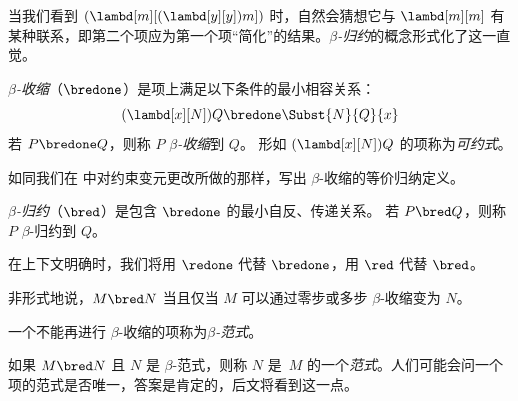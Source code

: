 \documentclass[../../../include/open-logic-section]{subfiles}
\begin{document}

当我们看到 $(\lambd[m][(\lambd[y][y]) m])$ 时，自然会猜想它与 $\lambd[m][m]$ 有某种联系，即第二个项应为第一个项“简化”的结果。\emph{$\beta$-归约}的概念形式化了这一直觉。

\begin{defn} 
  \emph{$\beta$-收缩}（$\bredone$）是项上满足以下条件的最小相容关系：
  \[
    (\lambd[x][N])Q \bredone \Subst{N}{Q}{x}
  \]
  若 $P \bredone Q$，则称 $P$ \emph{$\beta$-收缩}到 $Q$。
  形如 $(\lambd[x][N])Q$ 的项称为\emph{可约式}。
\end{defn}

\begin{prob} 
  如同我们在  中对约束变元更改所做的那样，写出 $\beta$-收缩的等价归纳定义。
\end{prob}

\begin{defn} 
  \emph{$\beta$-归约}（$\bred$）是包含 $\bredone$ 的最小自反、传递关系。
  若 $P \bred Q$，则称 $P$ $\beta$-归约到 $Q$。
\end{defn}

在上下文明确时，我们将用 $\redone$ 代替 $\bredone$，用 $\red$ 代替 $\bred$。

非形式地说，$M \bred N$ 当且仅当 $M$ 可以通过零步或多步 $\beta$-收缩变为 $N$。

\begin{defn}[$\beta$-范式]
一个不能再进行 $\beta$-收缩的项称为\emph{$\beta$-范式}。
\end{defn}

如果 $M \bred N$ 且 $N$ 是 $\beta$-范式，则称 $N$ 是~$M$ 的一个\emph{范式}。人们可能会问一个项的范式是否唯一，答案是肯定的，后文将看到这一点。
\end{document}
